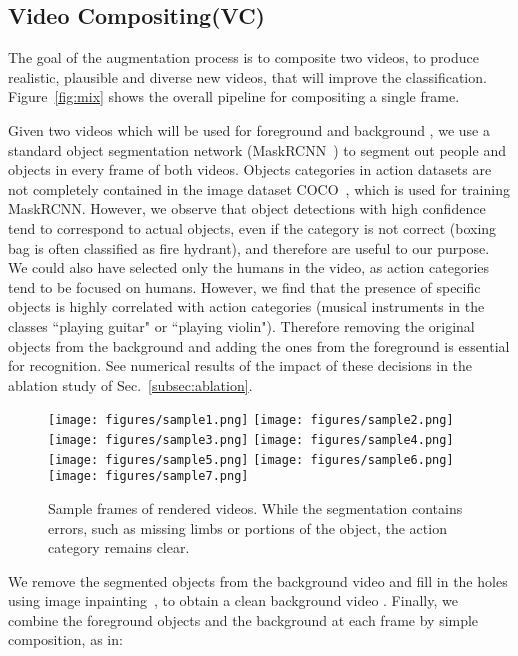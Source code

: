 \documentclass[runningheads]{llncs}
\newcommand{\VideoMix}{Video Compositing\xspace}
\begin{document}
\subsection{\VideoMix (VC)}
\label{subsec:video_mixing}

The goal of the augmentation process is to composite two videos, to produce realistic, plausible and diverse new videos, that will improve the classification. 
Figure~\ref{fig:mix} shows the overall pipeline for compositing a single frame. 

Given two videos which will be used for foreground  and background , we use a standard object segmentation network (MaskRCNN~\cite{maskrcnn}) to segment out people and objects in every frame of both videos. Objects categories in action datasets are not completely contained in the image dataset COCO~\cite{coco}, which is used for training MaskRCNN. However, we observe that object detections with high confidence tend to correspond to actual objects, even if the category is not correct (boxing bag is often classified as fire hydrant), and therefore are useful to our purpose. We could also have selected only the humans in the video, as action categories tend to be focused on humans. However, we find that the presence of specific objects is highly correlated with action categories (musical instruments in the classes ``playing guitar" or ``playing violin"). Therefore removing the original objects from the background and adding the ones from the foreground is essential for recognition. See numerical results of the impact of these decisions in the ablation study of Sec.~\ref{subsec:ablation}.

\begin{figure*}[t]
    \centering
    \texttt{[image: figures/sample1.png]}
    \texttt{[image: figures/sample2.png]}
    \texttt{[image: figures/sample3.png]}
    \texttt{[image: figures/sample4.png]}
    \texttt{[image: figures/sample5.png]}
    \texttt{[image: figures/sample6.png]}
    \texttt{[image: figures/sample7.png]}
    \caption{Sample frames of rendered videos. While the segmentation contains errors, such as missing limbs or portions of the object, the action category remains clear.}
    \label{fig:sample_videos}
\end{figure*}

We remove the segmented objects from the background video and fill in the holes using image inpainting~\cite{inpaint}, to obtain a clean background video . Finally, we combine the foreground objects and the background at each frame by simple composition, as in: 
\end{document}
